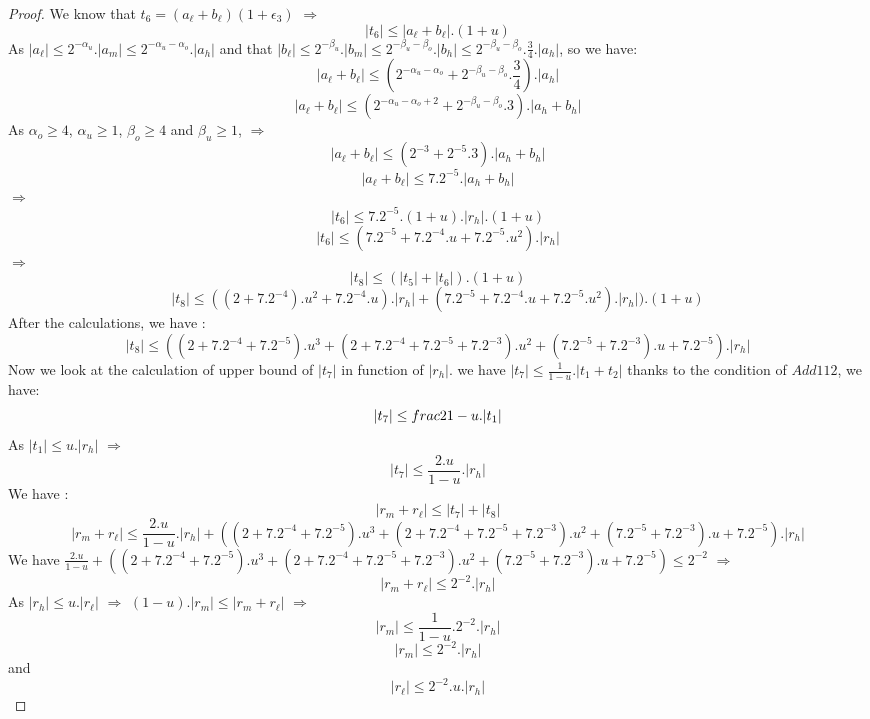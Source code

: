 \begin{proof}
We know that $t_6 = (a_{\ell} + b_{\ell})(1+\epsilon_3)$ $\Rightarrow$
$$\lvert t_6 \rvert \le \lvert a_{\ell} + b_{\ell} \rvert .(1+u) $$
As $ \lvert a_{\ell} \rvert \le 2^{-\alpha_u}.\lvert a_m \rvert \le 2^{-\alpha_u-\alpha_o} .\lvert a_h \rvert$ and that $\lvert b_{\ell} \rvert  \le 2^{-\beta_u}.\lvert b_m \rvert \le 2^{-\beta_u-\beta_o} .\lvert b_h \rvert \le 2^{-\beta_u-\beta_o}.\frac{3}{4}. \lvert a_h \rvert$, so we have:
$$ \lvert a_{\ell} + b_{\ell} \rvert \le (2^{-\alpha_u-\alpha_o}+2^{-\beta_u-\beta_o}.\frac{3}{4}).\lvert a_h \rvert$$
$$ \lvert a_{\ell} + b_{\ell} \rvert \le (2^{-\alpha_u-\alpha_o+2}+2^{-\beta_u-\beta_o}.3).\lvert a_h +b_h \rvert$$
As $\alpha_o \ge 4$, $\alpha_u \ge 1$, $\beta_o \ge 4$ and $\beta_u \ge 1$, $\Rightarrow$
$$ \lvert a_{\ell} + b_{\ell} \rvert \le (2^{-3}+2^{-5}.3).\lvert a_h +b_h \rvert$$
$$ \lvert a_{\ell} + b_{\ell} \rvert \le 7.2^{-5}.\lvert a_h +b_h \rvert$$
$\Rightarrow$
$$\lvert t_6 \rvert \le 7.2^{-5}.(1+u).\lvert r_h \rvert .(1+u) $$
$$\lvert t_6 \rvert \le (7.2^{-5} + 7.2^{-4}.u + 7.2^{-5}.u^2).\lvert r_h \rvert $$
$\Rightarrow$
$$ \lvert t_8 \rvert \le (\lvert t_5 \rvert  + \lvert t_6 \rvert).(1 + u)$$
$$ \lvert t_8 \rvert \le ((2+7.2^{-4}).u^2+7.2^{-4}.u). \lvert r_h  \rvert  + (7.2^{-5} + 7.2^{-4}.u + 7.2^{-5}.u^2).\lvert r_h \rvert).(1 + u)$$
After the calculations, we have :
$$ \lvert t_8 \rvert \le ((2+7.2^{-4}+7.2^{-5}).u^3+(2+7.2^{-4}+7.2^{-5}+7.2^{-3}).u^2+ (7.2^{-5}+7.2^{-3}).u +7.2^{-5}) . \lvert r_h  \rvert  $$
Now we look at the calculation of upper bound of $\lvert t_7 \rvert$ in function of $\lvert r_h \rvert $.
we have $\lvert t_7 \rvert \le \frac{1}{1-u}.\lvert t_1 + t_2 \rvert$ thanks to the condition of $Add112$, we have:
$$\lvert t_7 \rvert \le \\frac{2}{1-u}. \lvert t_1 \rvert$$
As $\lvert t_1 \rvert \le u.\lvert r_h \rvert$ $\Rightarrow$
$$\lvert t_7 \rvert \le \frac{2.u}{1-u}. \lvert r_h \rvert$$
We have :
$$\lvert r_m + r_{\ell} \rvert \le \lvert t_7 \rvert + \lvert t_8 \rvert $$
$$\lvert r_m + r_{\ell} \rvert \le \frac{2.u}{1-u}. \lvert r_h \rvert + ((2+7.2^{-4}+7.2^{-5}).u^3+(2+7.2^{-4}+7.2^{-5}+7.2^{-3}).u^2+ (7.2^{-5}+7.2^{-3}).u +7.2^{-5}) . \lvert r_h  \rvert $$
We have $\frac{2.u}{1-u}+((2+7.2^{-4}+7.2^{-5}).u^3+(2+7.2^{-4}+7.2^{-5}+7.2^{-3}).u^2+ (7.2^{-5}+7.2^{-3}).u +7.2^{-5}) \le 2^{-2}$
$\Rightarrow$
$$\lvert r_m + r_{\ell} \rvert \le 2^{-2}.\lvert r_h \rvert$$
As $\lvert r_h \rvert \le u. \lvert r_{\ell} \rvert$ $\Rightarrow$ $(1 - u). \lvert r_m \rvert \le \lvert r_m + r_{\ell} \rvert$ $\Rightarrow$
$$\lvert r_m \rvert \le \frac{1}{1-u}.2^{-2}.\lvert r_h \rvert$$
$$\lvert r_m \rvert \le 2^{-2}.\lvert r_h \rvert$$
and 
$$\lvert r_{\ell} \rvert \le 2^{-2}.u.\lvert r_h \rvert$$
\end{proof}

